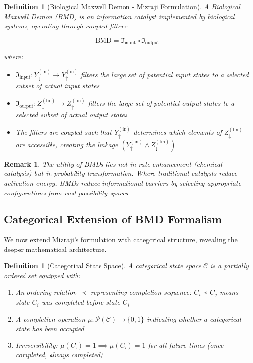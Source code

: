 \documentclass[12pt,a4paper]{article}
\newtheorem{definition}[theorem]{Definition}
\newtheorem{remark}[theorem]{Remark}
\begin{document}
\begin{definition}[Biological Maxwell Demon - Mizraji Formulation]
\label{def:bmd_mizraji}
A Biological Maxwell Demon (BMD) is an information catalyst implemented by biological systems, operating through coupled filters:

\begin{equation}
\text{BMD} = \Im_{\text{input}} \circ \Im_{\text{output}}
\end{equation}

where:
\begin{itemize}
\item $\Im_{\text{input}}: Y_{\downarrow}^{(\text{in})} \to Y_{\uparrow}^{(\text{in})}$ filters the large set of potential input states to a selected subset of actual input states
\item $\Im_{\text{output}}: Z_{\downarrow}^{(\text{fin})} \to Z_{\uparrow}^{(\text{fin})}$ filters the large set of potential output states to a selected subset of actual output states
\item The filters are coupled such that $Y_{\uparrow}^{(\text{in})}$ determines which elements of $Z_{\downarrow}^{(\text{fin})}$ are accessible, creating the linkage $(Y_{\uparrow}^{(\text{in})} \wedge Z_{\downarrow}^{(\text{fin})})$
\end{itemize}
\end{definition}

\begin{remark}
The utility of BMDs lies not in rate enhancement (chemical catalysis) but in \textit{probability transformation}. Where traditional catalysts reduce activation energy, BMDs reduce \textit{informational barriers} by selecting appropriate configurations from vast possibility spaces.
\end{remark}

\subsection{Categorical Extension of BMD Formalism}

We now extend Mizraji's formulation with categorical structure, revealing the deeper mathematical architecture.

\begin{definition}[Categorical State Space]
\label{def:categorical_space}
A categorical state space $\mathcal{C}$ is a partially ordered set equipped with:
\begin{enumerate}
\item An ordering relation $\prec$ representing completion sequence: $C_i \prec C_j$ means state $C_i$ was completed before state $C_j$
\item A completion operation $\mu: \mathcal{P}(\mathcal{C}) \to \{0,1\}$ indicating whether a categorical state has been occupied
\item Irreversibility: $\mu(C_i) = 1 \implies \mu(C_i) = 1$ for all future times (once completed, always completed)
\end{enumerate}
\end{definition}
\end{document}
